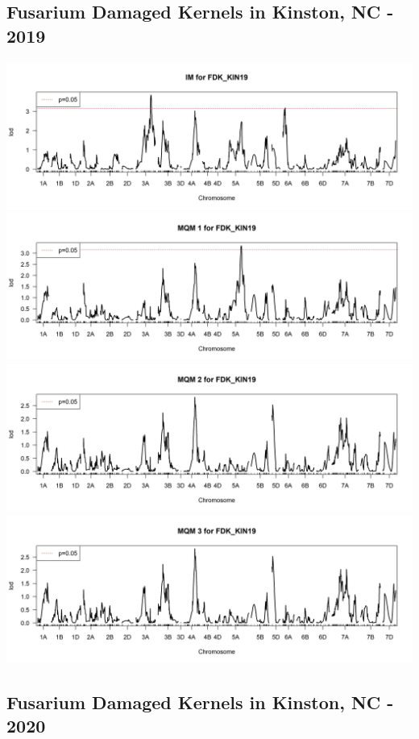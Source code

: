 \documentclass[
]{article}
\begin{document}
\subsection{Fusarium Damaged Kernels in Kinston, NC -
2019}\label{fusarium-damaged-kernels-in-kinston-nc---2019}

\includegraphics{Scan_IM_FDK_KIN19.jpg}
\includegraphics{Scan_MQM1_FDK_KIN19.jpg}
\includegraphics{Scan_MQM2_FDK_KIN19.jpg}
\includegraphics{Scan_MQM3_FDK_KIN19.jpg} \pagebreak

\subsection{Fusarium Damaged Kernels in Kinston, NC -
2020}\label{fusarium-damaged-kernels-in-kinston-nc---2020}
\end{document}
